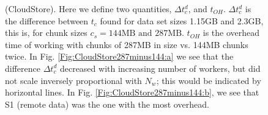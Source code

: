 \documentclass{rspublic}
\begin{document}
\begin{figure}
\begin{center}
\caption{(CloudStore). Here
we define two quantities, $\Delta t_c^d$, and $t_{OH}$. $\Delta t_c^d$
is the difference between $t_c$ found for data set sizes 1.15GB and
2.3GB, this is, for chunk sizes $c_s = 144\mbox{MB and } 287\mbox{MB}$.
$t_{OH}$ is the overhead time of working with chunks of 287MB in size
vs. 144MB chunks twice. In Fig. \ref{Fig:CloudStore287minus144:a} we
see that the difference $\Delta t_c^d$ decreased with increasing number of workers, but did
not scale inversely proportional with $N_w$; this would be indicated by horizontal lines. In Fig.
\ref{Fig:CloudStore287minus144:b}, we see that S1 (remote data)
was the one with the most overhead.}
\label{Fig:CloudStore287minus144}
\end{center}
\vspace{-0.4cm}
\end{figure}
\end{document}
